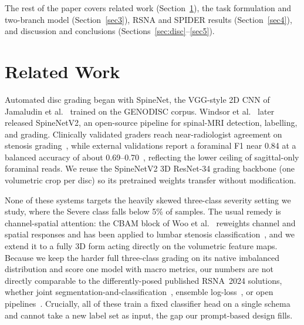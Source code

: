 \documentclass[runningheads]{llncs}
\begin{document}
The rest of the paper covers related work (Section~\ref{sec2}), the task formulation and two-branch model (Section~\ref{sec3}), RSNA and SPIDER results (Section~\ref{sec4}), and discussion and conclusions (Sections~\ref{sec:disc}--\ref{sec5}).

\section{Related Work}\label{sec2}

Automated disc grading began with SpineNet, the VGG-style 2D CNN of Jamaludin et al.~\cite{jamaludin2017} trained on the GENODISC corpus. Windsor et al.~\cite{windsor2022} later released SpineNetV2, an open-source pipeline for spinal-MRI detection, labelling, and grading. Clinically validated graders reach near-radiologist agreement on stenosis grading~\cite{hallinan2021}, while external validations report a foraminal F1 near 0.84 at a balanced accuracy of about 0.69--0.70~\cite{mcsweeney2023,nigru2024}, reflecting the lower ceiling of sagittal-only foraminal reads. We reuse the SpineNetV2 3D ResNet-34 grading backbone (one volumetric crop per disc) so its pretrained weights transfer without modification.

None of these systems targets the heavily skewed three-class severity setting we study, where the Severe class falls below 5\% of samples. The usual remedy is channel-spatial attention: the CBAM block of Woo et al.~\cite{woo2018cbam} reweights channel and spatial responses and has been applied to lumbar stenosis classification~\cite{lin2024cbam}, and we extend it to a fully 3D form acting directly on the volumetric feature maps. Because we keep the harder full three-class grading on its native imbalanced distribution and score one model with macro metrics, our numbers are not directly comparable to the differently-posed published RSNA~2024 solutions, whether joint segmentation-and-classification~\cite{aktan2025}, ensemble log-loss~\cite{kaggle2024}, or open pipelines~\cite{nshen2024}. Crucially, all of these train a fixed classifier head on a single schema and cannot take a new label set as input, the gap our prompt-based design fills.
\end{document}

